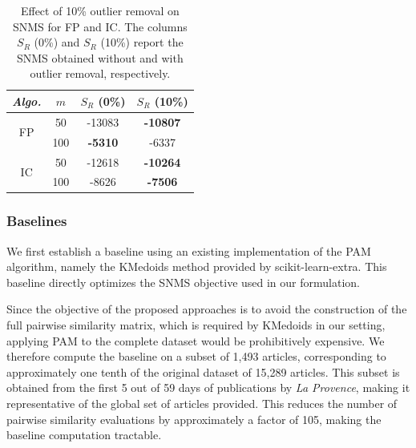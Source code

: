 \documentclass{ieeeaccess}
\newcommand{\toblack}{\color{black}}
\newcommand{\tored}{\color{red}}
\newcommand{\pk}[1]{{\tored [{\bfseries Pierre}: {\itshape #1}] \toblack}}
\newcommand{\kmedoidsalg}{KMedoids\xspace}
\newcommand{\partitioning}{FP\xspace}
\newcommand{\inclusion}{IC\xspace}
\begin{document}
\begin{table}[htbp]
    \centering
    \normalsize
    \begin{tabular}{ |c|c|c|c| }
        \hline
        \textit{Algo.} & $m$ & $S_R$ (0\%) & $S_R$ (10\%) \\
        \hline
        \multirow{2}{*}{\partitioning}
        & 50  & -13083 & \textbf{-10807} \\
        & 100 & \textbf{-5310} & -6337 \\
        \hline
        \multirow{2}{*}{\inclusion}
        & 50  & -12618 & \textbf{-10264} \\
        & 100 & -8626 & \textbf{-7506} \\
        \hline
    \end{tabular}
    \caption{\label{tab:outlier-removal}
    Effect of 10\% outlier removal on SNMS for
    \partitioning and \inclusion. The columns $S_R$ (0\%) and
    $S_R$ (10\%) report the SNMS obtained without and with outlier
    removal, respectively.}
\end{table}


\subsubsection{Baselines}

We first establish a baseline using an existing implementation of the PAM algorithm, namely the \kmedoidsalg method provided by scikit-learn-extra. This baseline directly optimizes the SNMS objective used in our formulation.

Since the objective of the proposed approaches is to avoid the construction of the full pairwise similarity matrix, which is required by \kmedoidsalg in our setting, applying PAM to the complete dataset would be prohibitively expensive. We therefore compute the baseline on a subset of 1,493 articles, corresponding to approximately one tenth of the original dataset of 15,289 articles. 
This subset is obtained from the first 5 out of 59 days of publications by {\itshape La Provence}, making it representative of the global set of articles provided.
This reduces the number of pairwise similarity evaluations by approximately a factor of 105, making the baseline computation tractable.
\end{document}
